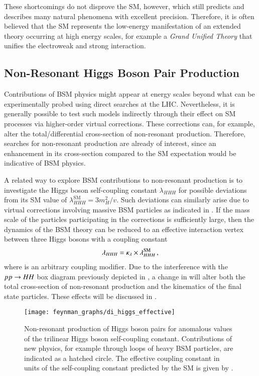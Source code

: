 These shortcomings do not disprove the SM, however, which still predicts and
describes many natural phenomena with excellent precision. Therefore, it is
often believed that the SM represents the low-energy manifestation of an
extended theory occurring at high energy scales, for example a \emph{Grand
  Unified Theory} that unifies the electroweak and strong interaction.


\subsection{Non-Resonant Higgs Boson Pair Production}%
\label{sec:bsm_nonresonant_hh}

Contributions of BSM physics might appear at energy scales beyond what can be
experimentally probed using direct searches at the LHC. Nevertheless, it is
generally possible to test such models indirectly through their effect on SM
processes via higher-order virtual corrections. These corrections can, for
example, alter the total/differential cross-section of non-resonant \HH
production. Therefore, searches for non-resonant \HH production are already of
interest, since an enhancement in its cross-section compared to the SM
expectation would be indicative of BSM physics.

A related way to explore BSM contributions to non-resonant \HH production is to
investigate the Higgs boson self-coupling constant $\lambda_{HHH}$ for possible
deviations from its SM value of $\lambda_{HHH}^\text{SM} = 3 m_{H}^2 / v$. Such
deviations can similarly arise due to virtual corrections involving massive BSM
particles as indicated in . If the mass scale of the
particles participating in the corrections is sufficiently large, then the
dynamics of the BSM theory can be reduced to an effective interaction vertex
between three Higgs bosons with a coupling constant
\begin{align*}
  \lambda_{HHH} = \kappa_{\lambda} \times \lambda_{HHH}^{\text{SM}} \,\text{,}
\end{align*}
where \klambda is an arbitrary coupling modifier. Due to the interference with
the $pp \to HH$ box diagram previously depicted in
, a change in \klambda will alter both the total
cross-section of non-resonant \HH production and the kinematics of the final
state particles. These effects will be discussed in
.

\begin{figure}[htbp]
  \centering

  \texttt{[image: feynman\_graphs/di\_higgs\_effective]}

  \caption{Non-resonant production of Higgs boson pairs for anomalous values of
    the trilinear Higgs boson self-coupling constant.  Contributions of new
    physics, for example through loops of heavy BSM particles, are indicated as
    a hatched circle. The effective coupling constant in units of the
    self-coupling constant predicted by the SM is given by \klambda.}%
  \label{fig:bsm_hh_prod_feyn}
\end{figure}

